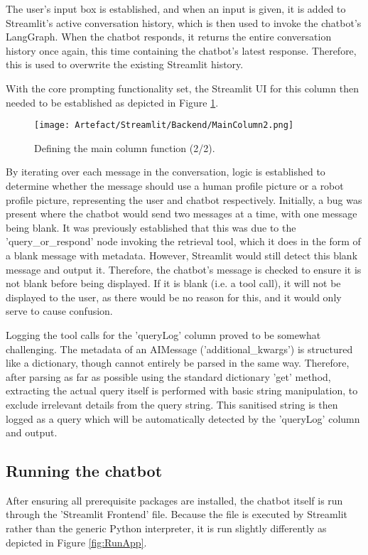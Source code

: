 \noindent The user's input box is established, and when an input is given, it is added to Streamlit's active 
conversation history, which is then used to invoke the chatbot's LangGraph. When the chatbot responds, it returns 
the entire conversation history once again, this time containing the chatbot's latest response. Therefore, this is used 
to overwrite the existing Streamlit history.

\para With the core prompting functionality set, the Streamlit UI for this column then needed to be established as depicted 
in Figure \ref{fig:StreamlitMainColumn2}.

\begin{figure}[H]
    \centering
    \texttt{[image: Artefact/Streamlit/Backend/MainColumn2.png]}
    \caption{Defining the main column function (2/2). \label{fig:StreamlitMainColumn2}}
\end{figure}

\noindent By iterating over each message in the conversation, logic is established to determine whether the message should 
use a human profile picture or a robot profile picture, representing the user and chatbot respectively. Initially, a bug was 
present where the chatbot would send two messages at a time, with one message being blank. It was previously established that 
this was due to the 'query\_or\_respond' node invoking the retrieval tool, which it does in the form of a blank message with 
metadata. However, Streamlit would still detect this blank message and output it. Therefore, the chatbot's message is checked 
to ensure it is not blank before being displayed. If it is blank (i.e. a tool call), it will not be displayed to the user, as 
there would be no reason for this, and it would only serve to cause confusion.

\para Logging the tool calls for the 'queryLog' column proved to be somewhat challenging. The metadata of an AIMessage ('additional\_kwargs')
is structured like a dictionary, though cannot entirely be parsed in the same way. Therefore, after parsing as far as possible using the 
standard dictionary 'get' method, extracting the actual query itself is performed with basic string manipulation, to exclude irrelevant 
details from the query string. This sanitised string is then logged as a query which will be automatically detected by the 'queryLog' column
and output.

\newpage 

\subsection{Running the chatbot}
After ensuring all prerequisite packages are installed, the chatbot itself is run through the 'Streamlit Frontend' file. Because the file 
is executed by Streamlit rather than the generic Python interpreter, it is run slightly differently as depicted in Figure \ref{fig:RunApp}.

